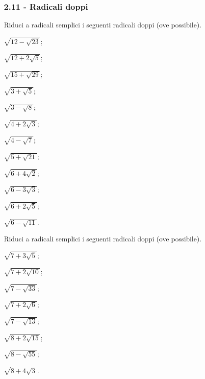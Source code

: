 \subsubsection*{2.11 - Radicali doppi}

\begin{esercizio}[\Ast]
 \label{ese:2.95}
Riduci a radicali semplici i seguenti radicali doppi (ove possibile).
 \begin{multicols}{4}
 \begin{enumeratea}
 \item $\sqrt{12-\sqrt{23}}$;
 \item $\sqrt{12+2\sqrt 5}$;
 \item $\sqrt{15+\sqrt{29}}$;
 \item $\sqrt{3+\sqrt 5}$;
 \item $\sqrt{3-\sqrt 8}$;
 \item $\sqrt{4+2\sqrt 3}$;
 \item $\sqrt{4-\sqrt 7}$;
 \item $\sqrt{5+\sqrt{21}}$;
 \item $\sqrt{6+4\sqrt 2}$;
 \item $\sqrt{6-3\sqrt 3}$;
 \item $\sqrt{6+2\sqrt 5}$;
 \item $\sqrt{6-\sqrt{11}}$.
 \end{enumeratea}
 \end{multicols}
\end{esercizio}

\begin{esercizio}[\Ast]
 \label{ese:2.96}
Riduci a radicali semplici i seguenti radicali doppi (ove possibile).
 \begin{multicols}{4}
 \begin{enumeratea}
 \item $\sqrt{7+3\sqrt 5}$;
 \item $\sqrt{7+2\sqrt{10}}$;
 \item $\sqrt{7-\sqrt{33}}$;
 \item $\sqrt{7+2\sqrt 6}$;
 \item $\sqrt{7-\sqrt{13}}$;
 \item $\sqrt{8+2\sqrt{15}}$;
 \item $\sqrt{8-\sqrt{55}}$;
 \item $\sqrt{8+4\sqrt 3}$.
 \end{enumeratea}
 \end{multicols}
\end{esercizio}

